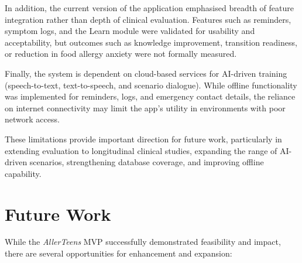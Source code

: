 \documentclass[MScCS]{uccthesis}
\begin{document}
In addition, the current version of the application emphasised breadth of feature integration rather than depth of clinical evaluation. Features such as reminders, symptom logs, and the Learn module were validated for usability and acceptability, but outcomes such as knowledge improvement, transition readiness, or reduction in food allergy anxiety were not formally measured.  

Finally, the system is dependent on cloud-based services for AI-driven training (speech-to-text, text-to-speech, and scenario dialogue). While offline functionality was implemented for reminders, logs, and emergency contact details, the reliance on internet connectivity may limit the app's utility in environments with poor network access.  

These limitations provide important direction for future work, particularly in extending evaluation to longitudinal clinical studies, expanding the range of AI-driven scenarios, strengthening database coverage, and improving offline capability.



\section{Future Work}
While the \textit{AllerTeens} MVP successfully demonstrated feasibility and impact, there are several opportunities for enhancement and expansion:  
\end{document}
